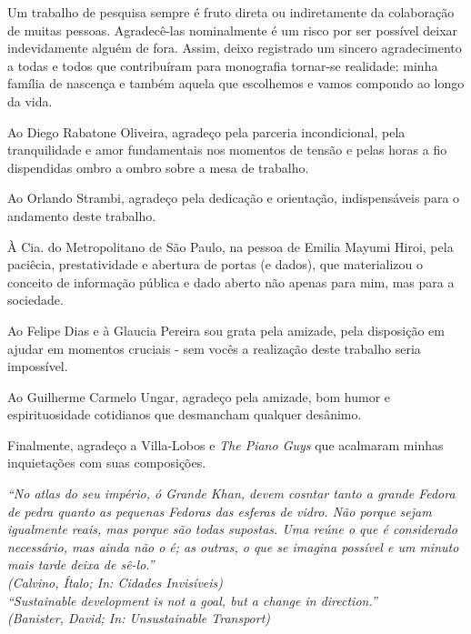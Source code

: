 \documentclass[
  12pt,        %
  openright,      %
  twoside,      %
  a4paper,      %
  english,      %
  brazil        %
]{abntex2}
\begin{document}
\begin{agradecimentos} 
Um trabalho de pesquisa sempre é fruto direta ou indiretamente da colaboração de muitas pessoas.
Agradecê-las nominalmente é um risco por ser possível deixar indevidamente alguém de fora.
Assim, deixo registrado um sincero agradecimento a todas e todos que contribuíram para monografia tornar-se realidade: minha família de nascença e também aquela que escolhemos e vamos compondo ao longo da vida.

Ao Diego Rabatone Oliveira, agradeço pela parceria incondicional, pela tranquilidade e amor fundamentais nos momentos de tensão e pelas horas a fio dispendidas ombro a ombro sobre a mesa de trabalho. 

Ao Orlando Strambi, agradeço pela dedicação e orientação, indispensáveis para o andamento deste trabalho.

À Cia. do Metropolitano de São Paulo, na pessoa de Emilia Mayumi Hiroi, pela paciêcia, prestatividade e abertura de portas (e dados), que materializou o conceito de informação pública e dado aberto não apenas para mim, mas para a sociedade.

Ao Felipe Dias e à Glaucia Pereira sou grata pela amizade, pela disposição em ajudar em momentos cruciais - sem vocês a realização deste trabalho seria impossível.

Ao Guilherme Carmelo Ungar, agradeço pela amizade, bom humor e espirituosidade cotidianos que desmancham qualquer desânimo.

Finalmente, agradeço a Villa-Lobos e \emph{The Piano Guys} que acalmaram minhas inquietações com suas composições.

\end{agradecimentos}

\begin{epigrafe}
    \vspace*{\fill}
  \begin{flushright}  
        \textit{``No atlas do seu império, ó Grande Khan, devem cosntar tanto a grande Fedora de pedra quanto as pequenas Fedoras das esferas de vidro. Não porque sejam igualmente reais, mas porque são todas supostas. Uma reúne o que é considerado necessário, mas ainda não o é; as outras, o que se imagina possível e um minuto mais tarde deixa de sê-lo.''\\
    (Calvino, Ítalo; In: Cidades Invisíveis)}\\%
        \textit{``Sustainable development is not a goal, but a change in direction.''\\
    (Banister, David; In: Unsustainable Transport)}\\
    
  \end{flushright}
\end{epigrafe}
\end{document}
